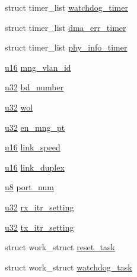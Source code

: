 \begin{DoxyCompactItemize}
\item 
struct timer\+\_\+list \hyperlink{structigb__adapter_a52832b6f86ae79e4262b75b36661be68}{watchdog\+\_\+timer}
\item 
struct timer\+\_\+list \hyperlink{structigb__adapter_ac11a44ad73617c02ac826d263b35ed19}{dma\+\_\+err\+\_\+timer}
\item 
struct timer\+\_\+list \hyperlink{structigb__adapter_a7e23bd9ac9e32b5da3f8e807af5b0c5f}{phy\+\_\+info\+\_\+timer}
\item 
\hyperlink{lib_2igb_2e1000__osdep_8h_acdc9cf0314be0ae5a01d6d4379a95edd}{u16} \hyperlink{structigb__adapter_a4cc29a4612e6f7cbe2c49b41ad1637a3}{mng\+\_\+vlan\+\_\+id}
\item 
\hyperlink{lib_2igb_2e1000__osdep_8h_a64e91c10a0d8fb627e92932050284264}{u32} \hyperlink{structigb__adapter_a6cd9dc976314452b3fa56402f4e3273e}{bd\+\_\+number}
\item 
\hyperlink{lib_2igb_2e1000__osdep_8h_a64e91c10a0d8fb627e92932050284264}{u32} \hyperlink{structigb__adapter_a9ed903019524c5d830e85c6454814513}{wol}
\item 
\hyperlink{lib_2igb_2e1000__osdep_8h_a64e91c10a0d8fb627e92932050284264}{u32} \hyperlink{structigb__adapter_ac0396f5a94edbdfc286d7e6fc27550b7}{en\+\_\+mng\+\_\+pt}
\item 
\hyperlink{lib_2igb_2e1000__osdep_8h_acdc9cf0314be0ae5a01d6d4379a95edd}{u16} \hyperlink{structigb__adapter_a769b08c3c5ef0960c66136e561a93b67}{link\+\_\+speed}
\item 
\hyperlink{lib_2igb_2e1000__osdep_8h_acdc9cf0314be0ae5a01d6d4379a95edd}{u16} \hyperlink{structigb__adapter_a06adafe39ef2dfbceac0f31970c54196}{link\+\_\+duplex}
\item 
\hyperlink{lib_2igb_2e1000__osdep_8h_a8baca7e76da9e0e11ce3a275dd19130c}{u8} \hyperlink{structigb__adapter_ab89764d4931eca8a703e4864c390e725}{port\+\_\+num}
\item 
\hyperlink{lib_2igb_2e1000__osdep_8h_a64e91c10a0d8fb627e92932050284264}{u32} \hyperlink{structigb__adapter_aebbc3c2e6199ad30f4dacdf1446543a4}{rx\+\_\+itr\+\_\+setting}
\item 
\hyperlink{lib_2igb_2e1000__osdep_8h_a64e91c10a0d8fb627e92932050284264}{u32} \hyperlink{structigb__adapter_a656e1ed19f6d6550e41ef4f8c7522663}{tx\+\_\+itr\+\_\+setting}
\item 
struct work\+\_\+struct \hyperlink{structigb__adapter_a9f5bf98ace0cecae82cbc96104d62981}{reset\+\_\+task}
\item 
struct work\+\_\+struct \hyperlink{structigb__adapter_a9993a1d4be5ad0cac1e37cdca3d06021}{watchdog\+\_\+task}

\end{DoxyCompactItemize}
